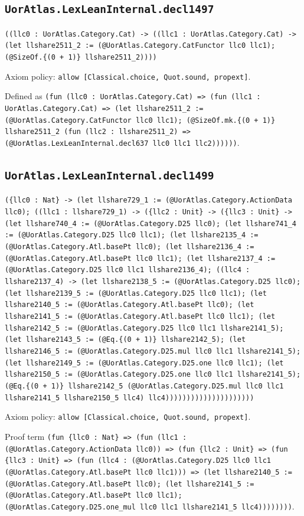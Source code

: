\documentclass[11pt]{article}
\begin{document}
\subsection*{\texttt{UorAtlas.LexLeanInternal.decl1497}}
\noindent\texttt{((llc0 : UorAtlas.Category.Cat) -> ((llc1 : UorAtlas.Category.Cat) -> (let llshare2511\_2 := (@UorAtlas.Category.CatFunctor llc0 llc1); (@SizeOf.\{(0 + 1)\} llshare2511\_2))))}\par
\noindent Axiom policy: \texttt{allow [Classical.choice, Quot.sound, propext]}.\par
\noindent Defined as \texttt{(fun (llc0 : UorAtlas.Category.Cat) => (fun (llc1 : UorAtlas.Category.Cat) => (let llshare2511\_2 := (@UorAtlas.Category.CatFunctor llc0 llc1); (@SizeOf.mk.\{(0 + 1)\} llshare2511\_2 (fun (llc2 : llshare2511\_2) => (@UorAtlas.LexLeanInternal.decl637 llc0 llc1 llc2))))))}.\par
\subsection*{\texttt{UorAtlas.LexLeanInternal.decl1499}}
\noindent\texttt{(\{llc0 : Nat\} -> (let llshare729\_1 := (@UorAtlas.Category.ActionData llc0); ((llc1 : llshare729\_1) -> (\{llc2 : Unit\} -> (\{llc3 : Unit\} -> (let llshare740\_4 := (@UorAtlas.Category.D25 llc0); (let llshare741\_4 := (@UorAtlas.Category.D25 llc0 llc1); (let llshare2135\_4 := (@UorAtlas.Category.Atl.basePt llc0); (let llshare2136\_4 := (@UorAtlas.Category.Atl.basePt llc0 llc1); (let llshare2137\_4 := (@UorAtlas.Category.D25 llc0 llc1 llshare2136\_4); ((llc4 : llshare2137\_4) -> (let llshare2138\_5 := (@UorAtlas.Category.D25 llc0); (let llshare2139\_5 := (@UorAtlas.Category.D25 llc0 llc1); (let llshare2140\_5 := (@UorAtlas.Category.Atl.basePt llc0); (let llshare2141\_5 := (@UorAtlas.Category.Atl.basePt llc0 llc1); (let llshare2142\_5 := (@UorAtlas.Category.D25 llc0 llc1 llshare2141\_5); (let llshare2143\_5 := (@Eq.\{(0 + 1)\} llshare2142\_5); (let llshare2146\_5 := (@UorAtlas.Category.D25.mul llc0 llc1 llshare2141\_5); (let llshare2149\_5 := (@UorAtlas.Category.D25.one llc0 llc1); (let llshare2150\_5 := (@UorAtlas.Category.D25.one llc0 llc1 llshare2141\_5); (@Eq.\{(0 + 1)\} llshare2142\_5 (@UorAtlas.Category.D25.mul llc0 llc1 llshare2141\_5 llshare2150\_5 llc4) llc4)))))))))))))))))))))}\par
\noindent Axiom policy: \texttt{allow [Classical.choice, Quot.sound, propext]}.\par
\noindent Proof term \texttt{(fun \{llc0 : Nat\} => (fun (llc1 : (@UorAtlas.Category.ActionData llc0)) => (fun \{llc2 : Unit\} => (fun \{llc3 : Unit\} => (fun (llc4 : (@UorAtlas.Category.D25 llc0 llc1 (@UorAtlas.Category.Atl.basePt llc0 llc1))) => (let llshare2140\_5 := (@UorAtlas.Category.Atl.basePt llc0); (let llshare2141\_5 := (@UorAtlas.Category.Atl.basePt llc0 llc1); (@UorAtlas.Category.D25.one\_mul llc0 llc1 llshare2141\_5 llc4))))))))}.\par
\end{document}
